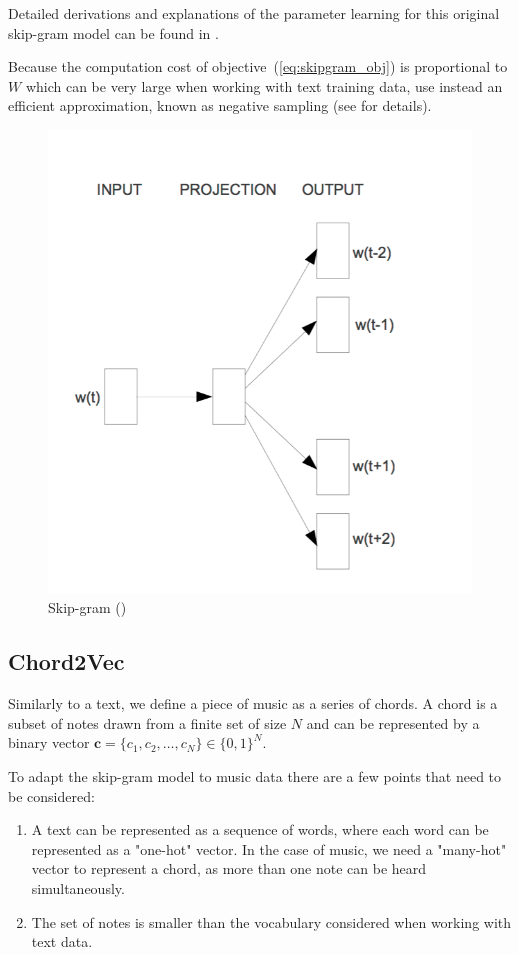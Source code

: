 \documentclass[12pt]{article}\pagestyle{myheadings}
\newcommand{\boldc}{\boldsymbol c}
\begin{document}
Detailed derivations and explanations of the parameter learning for this original skip-gram model can be found in \citep{Rong14}.

Because the computation cost of objective~(\ref{eq:skipgram_obj}) is proportional to $W$ which can be very large when working with text training data, \citet{mik2013} use instead an efficient approximation, known as negative sampling (see \citep{NIPS2013_5021} for details). 

\begin{figure}[ht]
\centering
\includegraphics[width=.7\linewidth]{figures/skipgram.png}
\caption{\label{fig:skipgram}Skip-gram (\citet{mik2013})}
\end{figure}


\subsection{Chord2Vec}
Similarly to a text, we define a piece of music as a series of chords. A chord is a subset of notes drawn from a finite set of size $N$ and can be represented by a binary vector $\boldc = \{c_1, c_2, \ldots, c_N\}\in \{0,1\}^N$.

\noindent To adapt the skip-gram model to music data there are a few points that need to be considered:

\begin{enumerate}
\item A text can be represented as a sequence of words, where each word can be represented as a "one-hot" vector. In the case of music, we need a "many-hot" vector to represent a chord, as more than one note can be heard simultaneously.  
\item The set of notes is smaller than the vocabulary considered when working with text data.
\end{enumerate}
 
\end{document}
